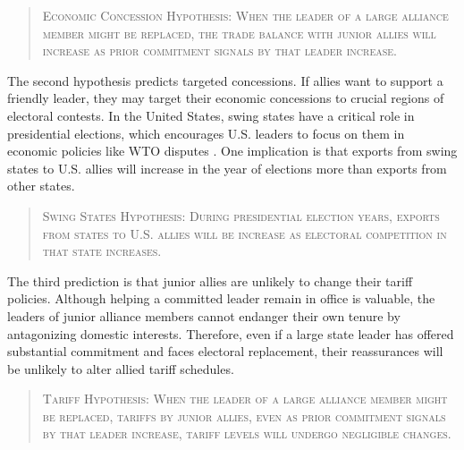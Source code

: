 \documentclass[12pt]{article}
\begin{document}
\begin{quote}
\textsc{Economic Concession Hypothesis: When the leader of a large alliance member might be replaced, the trade balance with junior allies will increase as prior commitment signals by that leader increase.}
\end{quote}



The second hypothesis predicts targeted concessions.
If allies want to support a friendly leader, they may target their economic concessions to crucial regions of electoral contests. 
In the United States, swing states have a critical role in presidential elections, which encourages U.S. leaders to focus on them in economic policies like WTO disputes \citep{Conconietal2017}.
One implication is that exports from swing states to U.S. allies will increase in the year of elections more than exports from other states.

\begin{quote}
\textsc{Swing States Hypothesis: During presidential election years, exports from states to U.S. allies will be increase as electoral competition in that state increases.}
\end{quote}

%
%
%


The third prediction is that junior allies are unlikely to change their tariff policies. 
Although helping a committed leader remain in office is valuable, the leaders of junior alliance members cannot endanger their own tenure by antagonizing domestic interests.
Therefore, even if a large state leader has offered substantial commitment and faces electoral replacement, their reassurances will be unlikely to alter allied tariff schedules. 


\begin{quote}
\textsc{Tariff Hypothesis:  When the leader of a large alliance member might be replaced, tariffs by junior allies, even as prior commitment signals by that leader increase, tariff levels will undergo negligible changes. }
\end{quote}
\end{document}
